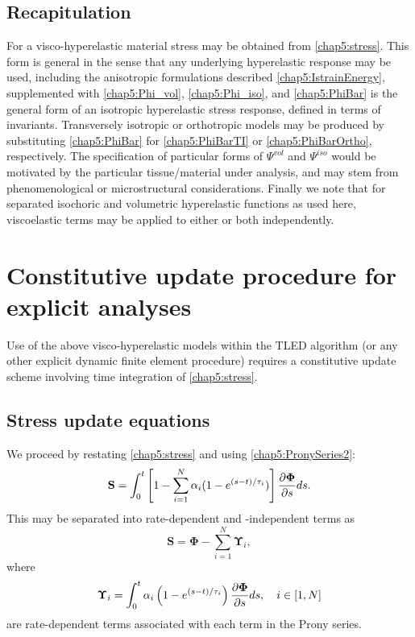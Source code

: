 	\subsection{Recapitulation}	
For a visco-hyperelastic material stress may be obtained from \eqref{chap5:stress}. This form is general in the sense that any underlying hyperelastic response may be used, including the anisotropic formulations described \eqref{chap5:IstrainEnergy}, supplemented with \eqref{chap5:Phi_vol}, \eqref{chap5:Phi_iso}, and \eqref{chap5:PhiBar} is the general form of an isotropic hyperelastic stress response, defined in terms of invariants. Transversely isotropic or orthotropic models may be produced by substituting \eqref{chap5:PhiBar} for \eqref{chap5:PhiBarTI} or \eqref{chap5:PhiBarOrtho}, respectively. The specification of particular forms of  $ \Psi^{vol} $ and $ \Psi^{iso} $ would be motivated by the particular tissue/material under analysis, and may stem from phenomenological or microstructural considerations. Finally we note that for separated isochoric and volumetric hyperelastic functions as used here, viscoelastic terms may be applied to either or both independently. 
	
	
\section{Constitutive update procedure for explicit analyses}

Use of the above visco-hyperelastic models within the TLED algorithm (or any other explicit dynamic finite element procedure) requires a constitutive update scheme involving time integration of \eqref{chap5:stress}. 

	\subsection{Stress update equations}	
We proceed by restating \eqref{chap5:stress} and using \eqref{chap5:PronySeries2}:	
\begin{equation}
\mathbf{S} = \int_0^t \left[ 1 - \sum_{i=1}^N \alpha_i (1-e^{(s-t)/\tau_i}) \right] \dfrac{\partial \boldsymbol \Phi}{\partial s} ds .
\end{equation}
This may be separated into rate-dependent and -independent terms as
\begin{equation}
\mathbf{S} = \boldsymbol \Phi - \sum_{i=1}^N \boldsymbol \Upsilon_i,
\end{equation}
where
\begin{equation}
\label{chap5:Upsilon}
\boldsymbol \Upsilon_i = \int_0^t \alpha_i \left( 1-e^{(s-t)/\tau_i} \right) \dfrac{\partial \boldsymbol \Phi}{\partial s} ds, \quad i \in [1, N]
\end{equation}
are rate-dependent terms associated with each term in the Prony series. 

